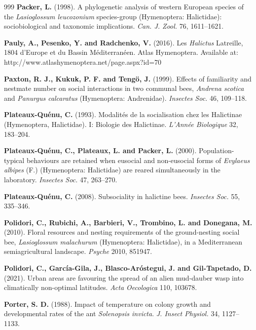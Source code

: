 \documentclass[11pt,a4paper]{article}
\begin{document}
\begin{thebibliography}{999}
\textbf{Packer, L.} (1998). A phylogenetic analysis of western European species of the \textit{Lasioglossum leucozonium} species-group (Hymenoptera: Halictidae): sociobiological and taxonomic implications. \textit{Can. J. Zool.} 76, 1611--1621.

\textbf{Pauly, A., Pesenko, Y. and Radchenko, V.} (2016).
Les \textit{Halictus} Latreille, 1804 d’Europe et du Bassin Méditerranéen. Atlas Hymenoptera.
Available at: http://www.atlashymenoptera.net/page.aspx?id=70

\textbf{Paxton, R. J., Kukuk, P. F. and Teng{\"o}, J.} (1999).
Effects of familiarity and nestmate number on social interactions in two communal bees, \textit{Andrena scotica} and \textit{Panurgus calcaratus} (Hymenoptera: Andrenidae).
\textit{Insectes Soc.} 46, 109--118.

\textbf{Plateaux-Quénu, C.} (1993). Modalités de la socialisation chez les Halictinae (Hymenoptera, Halictidae). I: Biologie des Halictinae. \textit{L’Année Biologique} 32, 183--204.

\textbf{Plateaux-Quénu, C., Plateaux, L. and Packer, L.} (2000). Population-typical behaviours are retained when eusocial and non-eusocial forms of \textit{Evylaeus albipes} (F.) (Hymenoptera: Halictidae) are reared simultaneously in the laboratory. \textit{Insectes Soc.} 47, 263--270.

\textbf{Plateaux-Quénu, C.} (2008).
Subsociality in halictine bees.
\textit{Insectes Soc.} 55, 335--346.

\textbf{Polidori, C., Rubichi, A., Barbieri, V., Trombino, L. and Donegana, M.} (2010). Floral resources and nesting requirements of the ground-nesting social bee, \textit{Lasioglossum malachurum} (Hymenoptera: Halictidae), in a Mediterranean semiagricultural landscape. \textit{Psyche} 2010, 851947.

\textbf{Polidori, C., García-Gila, J., Blasco-Aróstegui, J. and Gil-Tapetado, D.} (2021).
Urban areas are favouring the spread of an alien mud-dauber wasp into climatically non-optimal latitudes.
\textit{Acta Oecologica} 110, 103678.

\textbf{Porter, S. D.} (1988). Impact of temperature on colony growth and developmental rates of the ant \textit{Solenopsis invicta}. \textit{J. Insect Physiol.} 34, 1127--1133.


\end{thebibliography}
\end{document}
